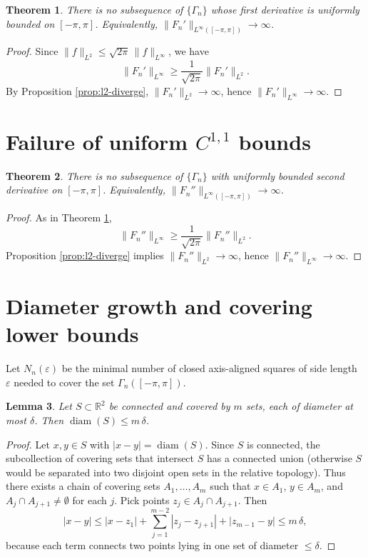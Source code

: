 \documentclass[11pt]{article}
\theoremstyle{plain}
\newtheorem{theorem}{Theorem}[section]
\newtheorem{lemma}[theorem]{Lemma}
\newcommand{\R}{\mathbb{R}}
\DeclareMathOperator{\diam}{diam}
\begin{document}
\begin{theorem}\label{thm:C1}
There is no subsequence of $\{\Gamma_n\}$ whose first derivative is uniformly bounded on $[-\pi,\pi]$.
Equivalently, $\|F_n'\|_{L^\infty([-\pi,\pi])}\to\infty$.
\end{theorem}

\begin{proof}
Since $\|f\|_{L^2}\le \sqrt{2\pi}\,\|f\|_{L^\infty}$, we have
\[
\|F_n'\|_{L^\infty}\ge \frac{1}{\sqrt{2\pi}}\|F_n'\|_{L^2}.
\]
By Proposition \ref{prop:l2-diverge}, $\|F_n'\|_{L^2}\to\infty$, hence $\|F_n'\|_{L^\infty}\to\infty$.
\end{proof}

\section{Failure of uniform $C^{1,1}$ bounds}\label{sec:C11}

\begin{theorem}\label{thm:C11}
There is no subsequence of $\{\Gamma_n\}$ with uniformly bounded second derivative on $[-\pi,\pi]$.
Equivalently, $\|F_n''\|_{L^\infty([-\pi,\pi])}\to\infty$.
\end{theorem}

\begin{proof}
As in Theorem \ref{thm:C1},
\[
\|F_n''\|_{L^\infty}\ge \frac{1}{\sqrt{2\pi}}\|F_n''\|_{L^2}.
\]
Proposition \ref{prop:l2-diverge} implies $\|F_n''\|_{L^2}\to\infty$, hence $\|F_n''\|_{L^\infty}\to\infty$.
\end{proof}

\section{Diameter growth and covering lower bounds}\label{sec:cover}

Let $N_n(\varepsilon)$ be the minimal number of closed axis-aligned squares of side length $\varepsilon$ needed to cover the set $\Gamma_n([-\pi,\pi])$.

\begin{lemma}\label{lem:connected-cover}
Let $S\subset\R^2$ be connected and covered by $m$ sets, each of diameter at most $\delta$.
Then $\diam(S)\le m\,\delta$.
\end{lemma}

\begin{proof}
Let $x,y\in S$ with $|x-y|=\diam(S)$.
Since $S$ is connected, the subcollection of covering sets that intersect $S$ has a connected union (otherwise $S$ would be separated into two disjoint open sets in the relative topology).
Thus there exists a chain of covering sets $A_1,\dots,A_m$ such that $x\in A_1$, $y\in A_m$, and $A_j\cap A_{j+1}\neq\emptyset$ for each $j$.
Pick points $z_j\in A_j\cap A_{j+1}$.
Then
\[
|x-y|
\le |x-z_1|+\sum_{j=1}^{m-2}|z_j-z_{j+1}|+|z_{m-1}-y|
\le m\,\delta,
\]
because each term connects two points lying in one set of diameter $\le\delta$.
\end{proof}
\end{document}
